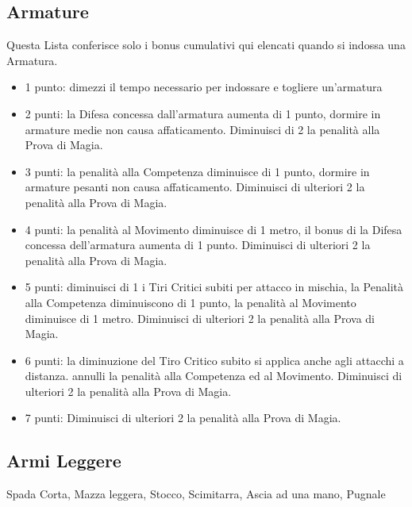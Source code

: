 \begin{multicols}{2}
\subsection{Armature} \label{listaarmature}

Questa Lista conferisce solo i bonus cumulativi qui elencati quando si indossa una Armatura.

\begin{itemize}[leftmargin=*] \setlength{\itemsep}{0pt}

\item 1 punto: dimezzi il tempo necessario per indossare e togliere un'armatura
\item 2 punti: la Difesa concessa dall'armatura aumenta di 1 punto, dormire in armature medie non causa affaticamento. Diminuisci di 2 la penalità alla Prova di Magia.
\item 3 punti: la penalità alla Competenza diminuisce di 1 punto, dormire in armature pesanti non causa affaticamento. Diminuisci di ulteriori 2 la penalità alla Prova di Magia.
\item 4 punti: la penalità al Movimento diminuisce di 1 metro, il bonus di la Difesa concessa dell'armatura aumenta di 1 punto. Diminuisci di ulteriori 2 la penalità alla Prova di Magia.
\item 5 punti: diminuisci di 1 i Tiri Critici subiti per attacco in mischia, la Penalità alla Competenza diminuiscono di 1 punto, la penalità al Movimento diminuisce di 1 metro. Diminuisci di ulteriori 2 la penalità alla Prova di Magia.
\item 6 punti: la diminuzione del Tiro Critico subito si applica anche agli attacchi a distanza. annulli la penalità alla Competenza ed al Movimento. Diminuisci di ulteriori 2 la penalità alla Prova di Magia.
\item 7 punti: Diminuisci di ulteriori 2 la penalità alla Prova di Magia.
\end{itemize}

\subsection{Armi Leggere} Spada Corta, Mazza leggera, Stocco, Scimitarra, Ascia ad una mano, Pugnale\label{listaarmileggere}

\begin{itemize}[leftmargin=*] \setlength{\itemsep}{0pt}


\end{itemize}
\end{multicols}

